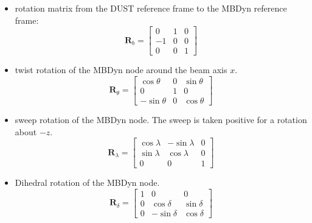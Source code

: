 \begin{itemize}
    \item rotation matrix from the DUST reference frame to the MBDyn reference frame:
    \begin{equation}
        \mathbf{R}_{b} = 
        \begin{bmatrix}
            0 & 1 & 0\\
            -1 & 0 & 0\\
            0 & 0 & 1
        \end{bmatrix}
        \label{eq:rotbeam}
    \end{equation}

    \item twist rotation of the MBDyn node around the beam axis $x$. 
    \begin{equation}
        \mathbf{R}_{\theta} = 
        \begin{bmatrix}
            \cos \theta & 0 & \sin\theta\\ 
            0 & 1 & 0\\ 
            -\sin\theta & 0 & \cos\theta
        \end{bmatrix}
        \label{eq:rottwist}
    \end{equation}
    
    \item sweep rotation of the MBDyn node. The sweep is taken positive for a rotation about $-z$. 
    \begin{equation}
        \mathbf{R}_{\lambda} = 
        \begin{bmatrix}
            \cos\lambda & -\sin\lambda & 0\\ 
            \sin\lambda & \cos\lambda & 0\\ 
            0 & 0 & 1 
        \end{bmatrix}
        \label{eq:rotsweep}
    \end{equation}
    
    \item Dihedral rotation of the MBDyn node. 
    \begin{equation}
        \mathbf{R}_{\delta} = 
        \begin{bmatrix}
            1 & 0 & 0\\ 
            0 & \cos\delta & \sin\delta\\ 
            0 & -\sin\delta & \cos\delta 
        \end{bmatrix}
        \label{eq:rotdih}
    \end{equation}
\end{itemize}



